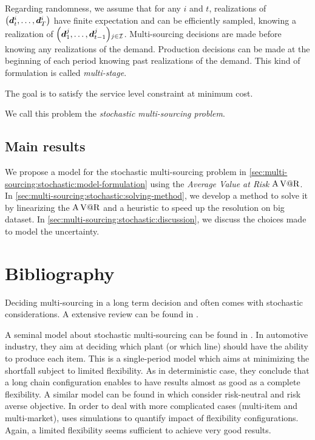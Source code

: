 Regarding randomness, we assume that for any $i$ and $t$, realizations of $\bracket{\va\demand_t^i,\ldots,\va\demand_{\horizon}^i}$ have finite expectation and can be efficiently sampled, knowing a realization of $\bracket{\va\demand_1^j,\ldots,\va\demand_{t-1}^j}_{j\in\REF}$.
Multi-sourcing decisions are made before knowing any realizations of the demand.
Production decisions can be made at the beginning of each period knowing past realizations of the demand.
This kind of formulation is called \emph{multi-stage}.


The goal is to satisfy the service level constraint at minimum cost.


We call this problem the \emph{stochastic multi-sourcing problem}.


\subsection{Main results}
\label{sec:multi-sourcing:stochastic:introduction:main-results}


We propose a model for the stochastic multi-sourcing problem in \cref{sec:multi-sourcing:stochastic:model-formulation} using the \emph{Average Value at Risk $\operatorname{A\operatorname{V@R}}$}.
In \cref{sec:multi-sourcing:stochastic:solving-method}, we develop a method to solve it by linearizing the $\operatorname{A\operatorname{V@R}}$ and a heuristic to speed up the resolution on big dataset.
In \cref{sec:multi-sourcing:stochastic:discussion}, we discuss the choices made to model the uncertainty.



\section{Bibliography}
\label{sec:multi-sourcing:stochastic:bibliography}


Deciding multi-sourcing in a long term decision and often comes with stochastic considerations.
A extensive review can be found in \cite{Yao2017}.


A seminal model about stochastic multi-sourcing can be found in \cite{Jordan1995}.
In automotive industry, they aim at deciding which plant (or which line) should have the ability to produce each item.
This is a single-period model which aims at minimizing the shortfall subject to limited flexibility.
As in deterministic case, they conclude that a long chain configuration enables to have results almost as good as a complete flexibility.
A similar model can be found in \cite{Brian2005} which consider risk-neutral and risk averse objective.
In order to deal with more complicated cases (multi-item and multi-market), \cite{Garavelli2003} uses simulations to quantify impact of flexibility configurations.
Again, a limited flexibility seems sufficient to achieve very good results.


